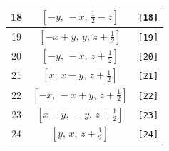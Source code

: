 \documentclass[fleqn,8pt]{jsarticle}
\begin{document}
\begin{longtable}{ccc}
18 & $\left[ - y,\, - x,\, \frac{1}{2} - z \right]$ & {\tt [18]} \\ \hline
19 & $\left[ - x + y,\, y,\, z + \frac{1}{2} \right]$ & {\tt [19]} \\ \hline
20 & $\left[ - y,\, - x,\, z + \frac{1}{2} \right]$ & {\tt [20]} \\ \hline
21 & $\left[ x,\, x - y,\, z + \frac{1}{2} \right]$ & {\tt [21]} \\ \hline
22 & $\left[ - x,\, - x + y,\, z + \frac{1}{2} \right]$ & {\tt [22]} \\ \hline
23 & $\left[ x - y,\, - y,\, z + \frac{1}{2} \right]$ & {\tt [23]} \\ \hline
24 & $\left[ y,\, x,\, z + \frac{1}{2} \right]$ & {\tt [24]} \\
\end{longtable}
\end{document}
